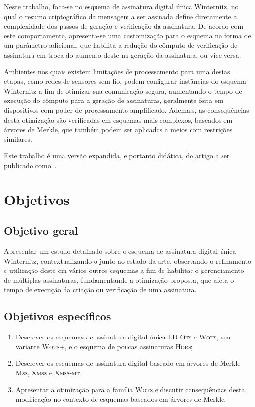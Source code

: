 \documentclass[12pt,notitlepage]{report}
\newcommand{\lots}{\textsc{LD-Ots}}
\newcommand{\wots}{\textsc{Wots}}
\newcommand{\wotsplus}{\textsc{Wots+}}
\newcommand{\hors}{\textsc{Hors}}
\newcommand{\mss}{\textsc{Mss}}
\newcommand{\xmss}{\textsc{Xmss}}
\newcommand{\xmssmt}{\textsc{Xmss-mt}}
\begin{document}
Neste trabalho, foca-se no esquema de assinatura digital única Winternitz, 
no qual o resumo criptográfico da mensagem a ser assinada define diretamente
a complexidade dos passos de geração e verificação da assinatura. De acordo
com este comportamento, apresenta-se uma customização para o esquema na forma
de um parâmetro adicional, que habilita a redução do cômputo de verificação de
assinatura em troca do aumento deste na geração da assinatura, ou vice-versa.

Ambientes nos quais existem limitações de processamento para uma destas etapas,
como redes de sensores sem fio, podem configurar instâncias do esquema 
Winternitz a fim de otimizar sua comunicação segura, aumentando o tempo de
execução do cômputo para a geração de assinaturas, geralmente feita em
dispositivos com poder de processamento amplificado. Ademais, as consequências
desta otimização são verificadas em esquemas mais complexos, baseados em árvores
de Merkle, que também podem ser aplicados a meios com restrições similares.

Este trabalho é uma versão expandida,
e portanto didática, do artigo a ser publicado como~\cite{Peri1806:Tuning}.

\section{Objetivos}
\label{section:objectives}

\subsection{Objetivo geral}
\label{subsection:general}

Apresentar um estudo detalhado sobre o esquema de
assinatura digital única Winternitz, contextualizando-o junto ao estado da
arte, observando o refinamento e utilização deste em vários outros esquemas a
fim de habilitar o gerenciamento de múltiplas assinaturas, fundamentando a
otimização proposta, que afeta o tempo de execução da criação ou
verificação de uma assinatura.

\subsection{Objetivos específicos}
\label{subsection:specific}

\begin{enumerate}
    \item Descrever os esquemas de assinatura digital única \lots{} e \wots{},
    sua variante \wotsplus{}, e o esquema de poucas assinaturas \hors{};
    \item Descrever os esquemas de assinatura digital baseado em árvores de
    Merkle \mss{}, \xmss{} e \xmssmt{};
    \item Apresentar a otimização para a família \wots{} e discutir consequências
    desta modificação no contexto de esquemas baseados em árvores de Merkle.
\end{enumerate}
\end{document}
